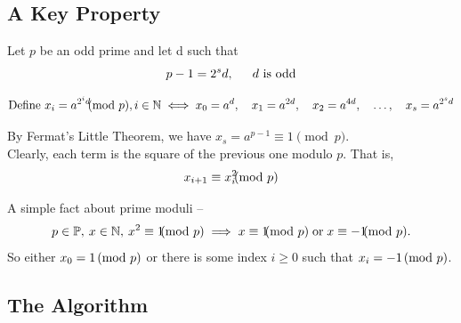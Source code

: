 \subsection{A Key Property}

Let \(p\) be an odd prime and let d such that
\[
p-1=2^s d, \hspace{1.5em} d \text{ is odd}
\]

\[
\text{Define }
x_i=a^{2^{i}d} \hspace{-0.7em} \pmod{p}, i \in \mathbb{N}
\iff
x_0=a^{d},
\quad
x_1=a^{2d},
\quad
x_2=a^{4d},
\quad
\ldots,
\quad
x_s=a^{2^s d}
\]

\vspace{1em}
\noindent By Fermat's Little Theorem, we have $x_s=a^{p-1}\equiv1\pmod p$.\\


\noindent Clearly, each term is the square of the previous one modulo \(p\). That is,
\[
x_{i+1}
\equiv
x_i^2
\hspace{-0.7em}
\pmod p
\]

\noindent A simple fact about prime moduli --
\[
p \in \mathbb{P},\hspace{0.2em} x \in \mathbb{N}, \hspace{0.2em}
x^2
\equiv
1
\hspace{-0.7em}
\pmod p
\implies
x
\equiv
1
\hspace{-0.7em}
\pmod p
\; \text{or} \;
x
\equiv
-1
\hspace{-0.7em}
\pmod p.
\]
\vspace{1em}
\noindent So either $x_0=1 \hspace{-0.3em} \pmod p$ or there is 
some index \(i \ge 0\) such that $x_i=-1 \hspace{-0.3em} \pmod p$.

\subsection{The Algorithm}

